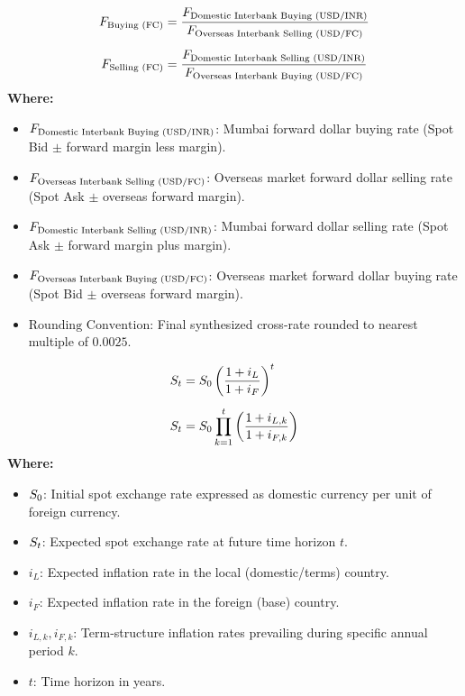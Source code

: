 \begin{formulabox}
\begin{align*}
    F_{\text{Buying (FC)}} &= \frac{F_{\text{Domestic Interbank Buying (USD/INR)}}}{F_{\text{Overseas Interbank Selling (USD/FC)}}} \\[0.5em]
    F_{\text{Selling (FC)}} &= \frac{F_{\text{Domestic Interbank Selling (USD/INR)}}}{F_{\text{Overseas Interbank Buying (USD/FC)}}}
\end{align*}
\textbf{Where:}
\begin{itemize}[leftmargin=*, noitemsep]
    \item $F_{\text{Domestic Interbank Buying (USD/INR)}}$: Mumbai forward dollar buying rate (Spot Bid $\pm$ forward margin less margin).
    \item $F_{\text{Overseas Interbank Selling (USD/FC)}}$: Overseas market forward dollar selling rate (Spot Ask $\pm$ overseas forward margin).
    \item $F_{\text{Domestic Interbank Selling (USD/INR)}}$: Mumbai forward dollar selling rate (Spot Ask $\pm$ forward margin plus margin).
    \item $F_{\text{Overseas Interbank Buying (USD/FC)}}$: Overseas market forward dollar buying rate (Spot Bid $\pm$ overseas forward margin).
    \item $\text{Rounding Convention}$: Final synthesized cross-rate rounded to nearest multiple of $0.0025$.
\end{itemize}
\end{formulabox}


\begin{formulabox}
\begin{align*}
    S_t &= S_0 \left( \frac{1 + i_L}{1 + i_F} \right)^t \\[0.5em]
    S_t &= S_0 \prod_{k=1}^t \left( \frac{1 + i_{L,k}}{1 + i_{F,k}} \right)
\end{align*}
\textbf{Where:}
\begin{itemize}[leftmargin=*, noitemsep]
    \item $S_0$: Initial spot exchange rate expressed as domestic currency per unit of foreign currency.
    \item $S_t$: Expected spot exchange rate at future time horizon $t$.
    \item $i_L$: Expected inflation rate in the local (domestic/terms) country.
    \item $i_F$: Expected inflation rate in the foreign (base) country.
    \item $i_{L,k}, i_{F,k}$: Term-structure inflation rates prevailing during specific annual period $k$.
    \item $t$: Time horizon in years.
\end{itemize}
\end{formulabox}

